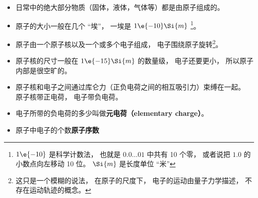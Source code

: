 
\begin{issues}
\issueDraft
\end{issues}

\begin{itemize}
\item 日常中的绝大部分物质（固体，液体，气体等）都是由原子组成的。
\item 原子的大小一般在几个 “埃”， 一埃是 $1\e{-10}\Si{m}$ \footnote{$1\e{-10}$ 是科学计数法， 也就是 $0.0\dots01$ 中共有 10 个零， 或者说把 $1.0$ 的小数点向左移动 10 位。 $\Si{m}$ 是长度单位 “米”}。 %
\item 原子由一个原子核以及一个或多个电子组成， 电子围绕原子旋转\footnote{这只是一个模糊的说法， 在原子的尺度下， 电子的运动由量子力学描述， 不存在运动轨迹的概念。}。
\item 原子核的尺寸一般在 $1\e{-15}\Si{m}$ 的数量级， 电子还要更小， 所以原子内部是很空旷的。
\item 原子核和电子之间通过库仑力（正负电荷之间的相互吸引力）束缚在一起。 原子核带正电荷， 电子带负电荷。 %
\item 电子所带的负电荷的多少叫做\textbf{元电荷（elementary charge）}。
\item 原子中电子的个数\textbf{原子序数}
\end{itemize}
